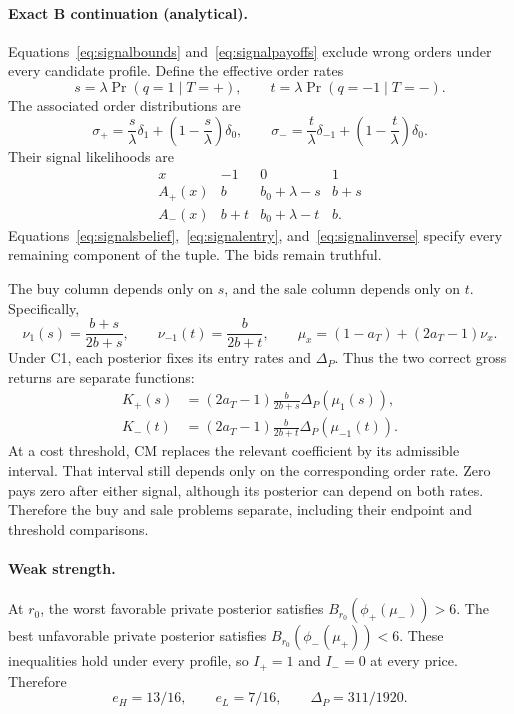 \documentclass[12pt]{article}
\begin{document}
\paragraph{Exact B continuation (analytical).}
Equations~\eqref{eq:signalbounds} and~\eqref{eq:signalpayoffs} exclude wrong orders under every candidate profile.
Define the effective order rates
\[
 s=\lambda\Pr(q=1\mid T=+),\qquad t=\lambda\Pr(q=-1\mid T=-).
\]
The associated order distributions are
\[
 \sigma_+=\frac{s}{\lambda}\delta_1+
 \left(1-\frac{s}{\lambda}\right)\delta_0,\qquad
 \sigma_-=\frac{t}{\lambda}\delta_{-1}+
 \left(1-\frac{t}{\lambda}\right)\delta_0.
\]
Their signal likelihoods are
\begin{equation}\label{eq:mixedlaws}
\begin{array}{c|ccc}
 x&-1&0&1\\ \hline
 A_+(x)&b&b_0+\lambda-s&b+s\\
 A_-(x)&b+t&b_0+\lambda-t&b.
\end{array}
\end{equation}
Equations~\eqref{eq:signalsbelief},~\eqref{eq:signalentry}, and~\eqref{eq:signalinverse} specify every remaining component of the tuple.
The bids remain truthful.

The buy column depends only on $s$, and the sale column depends only on $t$.
Specifically,
\[
 \nu_1(s)=\frac{b+s}{2b+s},\qquad \nu_{-1}(t)=\frac{b}{2b+t},\qquad
 \mu_x=(1-a_T)+(2a_T-1)\nu_x.
\]
Under C1, each posterior fixes its entry rates and $\Delta_P$.
Thus the two correct gross returns are separate functions:
\[
 \begin{aligned}
 K_+(s)&=(2a_T-1)\frac{b}{2b+s}\Delta_P(\mu_1(s)),\\
 K_-(t)&=(2a_T-1)\frac{b}{2b+t}\Delta_P(\mu_{-1}(t)).
 \end{aligned}
\]
At a cost threshold, CM replaces the relevant coefficient by its admissible interval.
That interval still depends only on the corresponding order rate.
Zero pays zero after either signal, although its posterior can depend on both rates.
Therefore the buy and sale problems separate, including their endpoint and threshold comparisons.

\paragraph{Weak strength.}
At $r_0$, the worst favorable private posterior satisfies $B_{r_0}(\phi_+(\mu_-))>6$.
The best unfavorable private posterior satisfies $B_{r_0}(\phi_-(\mu_+))<6$.
These inequalities hold under every profile, so $I_+=1$ and $I_-=0$ at every price.
Therefore
\[
 e_H=13/16,\qquad e_L=7/16,\qquad \Delta_P=311/1920.
\]
\end{document}
